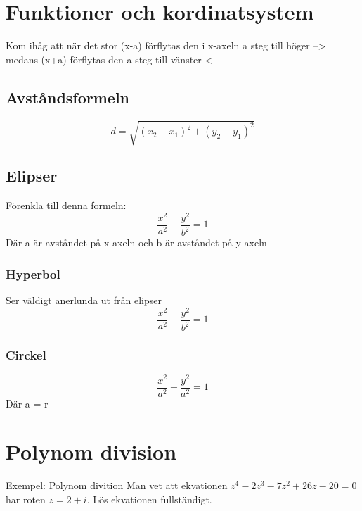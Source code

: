 \begin{multicols}{2}
\section{Funktioner och kordinatsystem}
Kom ihåg att när det stor (x-a) förflytas den i x-axeln a steg till höger --> medans (x+a) förflytas den a steg till vänster <-- 
\subsection{Avståndsformeln}
\begin{equation*}
d = \sqrt { \left( x _ { 2 } - x _ { 1 } \right) ^ { 2 } + \left( y _ { 2 } - y _ { 1 } \right) ^ { 2 } }
\end{equation*}


\subsection{Elipser}
Förenkla till denna formeln:
\begin{equation*}
\frac { x ^ { 2 } } { a ^ { 2 } } + \frac { y ^ { 2 } } { b ^ { 2 } } = 1
\end{equation*}
Där a är avståndet på x-axeln och b är avståndet på y-axeln


\subsubsection{Hyperbol}
Ser väldigt anerlunda ut från elipser
\begin{equation*}
\frac { x ^ { 2 } } { a ^ { 2 } } - \frac { y ^ { 2 } } { b ^ { 2 } } = 1
\end{equation*}


\subsubsection{Circkel}
\begin{equation*}
\frac { x ^ { 2 } } { a ^ { 2 } } + \frac { y ^ { 2 } } { a ^ { 2 } } = 1
\end{equation*}
Där a = r


\section{Polynom division}
\begin{exampleblock}{Exempel: Polynom divition}
Man vet att ekvationen $z^4 - 2z^3 - 7z^2 + 26z - 20 = 0$
har roten $z = 2 + i$. Lös ekvationen fullständigt.\newline


\end{exampleblock}
\end{multicols}
